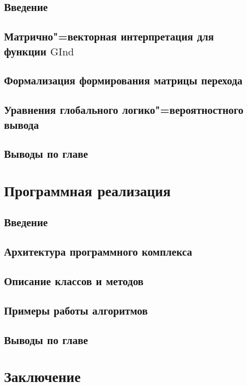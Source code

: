 \documentclass[14pt]{matmex-diploma-custom}
\newcommand{\Gind}{\mathrm{GInd}}
\begin{document}
\subsection{Введение}

\subsection{Матрично"=векторная интерпретация для функции $\Gind$}

\subsection{Формализация формирования матрицы перехода}

\subsection{Уравнения глобального логико"=вероятностного вывода}

\subsection{Выводы по главе}



\section{Программная реализация}
\subsection{Введение}

\subsection{Архитектура программного комплекса}

\subsection{Описание классов и методов}

\subsection{Примеры работы алгоритмов}

\subsection{Выводы по главе}


\section*{Заключение}

\end{document}
